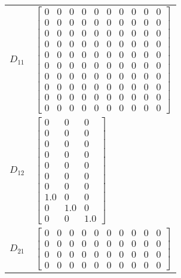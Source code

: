 \begin{tabular}{cl}
 $D_{11}$ & $\left[\begin{matrix}0 & 0 & 0 & 0 & 0 & 0 & 0 & 0 & 0 & 0\\0 & 0 & 0 & 0 & 0 & 0 & 0 & 0 & 0 & 0\\0 & 0 & 0 & 0 & 0 & 0 & 0 & 0 & 0 & 0\\0 & 0 & 0 & 0 & 0 & 0 & 0 & 0 & 0 & 0\\0 & 0 & 0 & 0 & 0 & 0 & 0 & 0 & 0 & 0\\0 & 0 & 0 & 0 & 0 & 0 & 0 & 0 & 0 & 0\\0 & 0 & 0 & 0 & 0 & 0 & 0 & 0 & 0 & 0\\0 & 0 & 0 & 0 & 0 & 0 & 0 & 0 & 0 & 0\\0 & 0 & 0 & 0 & 0 & 0 & 0 & 0 & 0 & 0\\0 & 0 & 0 & 0 & 0 & 0 & 0 & 0 & 0 & 0\end{matrix}\right]$                                                                                                                                                                                                                                      \\
 $D_{12}$ & $\left[\begin{matrix}0 & 0 & 0\\0 & 0 & 0\\0 & 0 & 0\\0 & 0 & 0\\0 & 0 & 0\\0 & 0 & 0\\0 & 0 & 0\\1.0 & 0 & 0\\0 & 1.0 & 0\\0 & 0 & 1.0\end{matrix}\right]$                                                                                                                                                                                                                                                                                                                                                                                                                                                                                                                        \\
 $D_{21}$ & $\left[\begin{matrix}0 & 0 & 0 & 0 & 0 & 0 & 0 & 0 & 0 & 0\\0 & 0 & 0 & 0 & 0 & 0 & 0 & 0 & 0 & 0\\0 & 0 & 0 & 0 & 0 & 0 & 0 & 0 & 0 & 0\\0 & 0 & 0 & 0 & 0 & 0 & 0 & 0 & 0 & 0\end{matrix}\right]$                                                                                                                                                                                                                                                                                                                                                                                                                                                                                \\
\hline
\end{tabular}